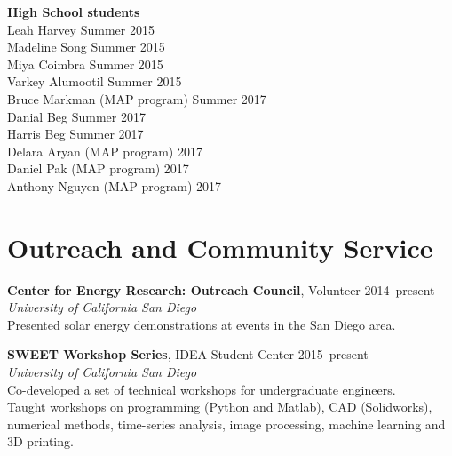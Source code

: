 \documentclass[]{res}
\begin{document}
\begin{resume}
\textbf{High School students} \\
Leah Harvey \hfill Summer 2015 \\
Madeline Song \hfill Summer 2015 \\
Miya Coimbra \hfill Summer 2015 \\
Varkey Alumootil \hfill Summer 2015 \\
Bruce Markman (MAP program) \hfill Summer 2017 \\
Danial Beg \hfill Summer 2017 \\
Harris Beg \hfill Summer 2017 \\
Delara Aryan (MAP program) \hfill 2017 \\
Daniel Pak (MAP program) \hfill 2017 \\
Anthony Nguyen (MAP program) \hfill 2017



\section{Outreach and Community Service}
\vspace{0.1in}
%

\textbf{Center for Energy Research: Outreach Council}, Volunteer \hfill 2014--present \\
\textit{University of California San Diego} \\
Presented solar energy demonstrations at events in the San Diego area.


\textbf{SWEET Workshop Series}, IDEA Student Center \hfill 2015--present \\
\textit{University of California San Diego} \\
Co-developed a set of technical workshops for undergraduate engineers. \\
Taught workshops on programming (Python and Matlab), CAD (Solidworks),
numerical methods, time-series analysis, image processing, machine learning and
3D printing.



\end{resume}
\end{document}
